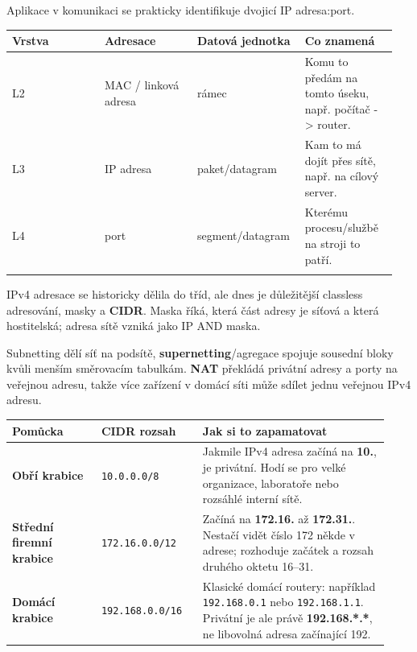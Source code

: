 Aplikace v komunikaci se prakticky identifikuje dvojicí IP adresa:port.

\begin{longtable}{p{0.237\linewidth}p{0.237\linewidth}p{0.237\linewidth}p{0.237\linewidth}}
\toprule
\textbf{Vrstva} & \textbf{Adresace} & \textbf{Datová jednotka} & \textbf{Co znamená} \\
\midrule\endhead
L2 & MAC / linková adresa & rámec & Komu to předám na tomto úseku, např. počítač -> router. \\
\addlinespace
L3 & IP adresa & paket/datagram & Kam to má dojít přes sítě, např. na cílový server. \\
\addlinespace
L4 & port & segment/datagram & Kterému procesu/službě na stroji to patří. \\
\addlinespace
\bottomrule
\end{longtable}

IPv4 adresace se historicky dělila do tříd, ale dnes je důležitější classless adresování, masky a \textbf{CIDR}. Maska říká, která část adresy je síťová a která hostitelská; adresa sítě vzniká jako IP AND maska.

Subnetting dělí síť na podsítě, \textbf{supernetting}/agregace spojuje sousední bloky kvůli menším směrovacím tabulkám. \textbf{NAT} překládá privátní adresy a porty na veřejnou adresu, takže více zařízení v domácí síti může sdílet jednu veřejnou IPv4 adresu.


\begin{longtable}{p{0.22\linewidth}p{0.25\linewidth}p{0.46\linewidth}}
\toprule
\textbf{Pomůcka} & \textbf{CIDR rozsah} & \textbf{Jak si to zapamatovat} \\
\midrule\endhead
\textbf{Obří krabice} & \texttt{10.0.0.0/8} & Jakmile IPv4 adresa začíná na \textbf{10.}, je privátní. Hodí se pro velké organizace, laboratoře nebo rozsáhlé interní sítě. \\
\addlinespace
\textbf{Střední firemní krabice} & \texttt{172.16.0.0/12} & Začíná na \textbf{172.16.} až \textbf{172.31.}. Nestačí vidět číslo 172 někde v adrese; rozhoduje začátek a rozsah druhého oktetu 16--31. \\
\addlinespace
\textbf{Domácí krabice} & \texttt{192.168.0.0/16} & Klasické domácí routery: například \texttt{192.168.0.1} nebo \texttt{192.168.1.1}. Privátní je ale právě \textbf{192.168.*.*}, ne libovolná adresa začínající 192. \\
\bottomrule
\end{longtable}

